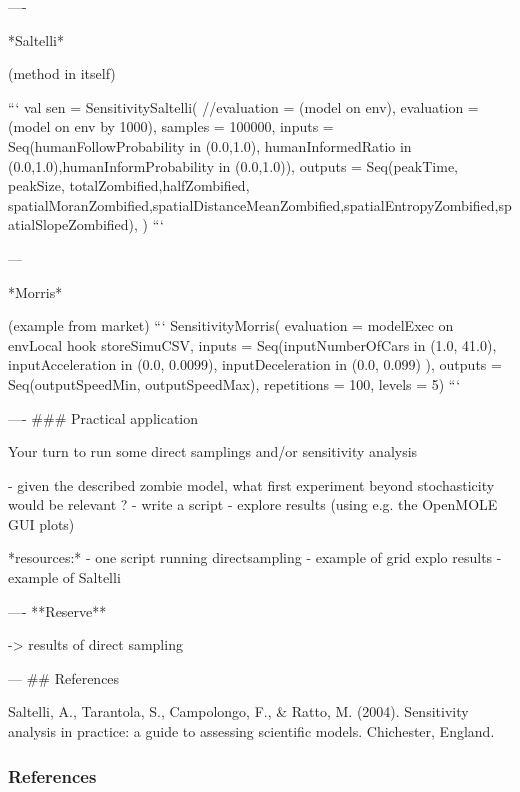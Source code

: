 \documentclass{../beamer_template/myBeamer}
\begin{document}
----

*Saltelli*

(method in itself)

```
val sen = SensitivitySaltelli(
  //evaluation = (model on env),
  evaluation = (model on env by 1000),
  samples = 100000,
  inputs = Seq(humanFollowProbability in (0.0,1.0), humanInformedRatio in (0.0,1.0),humanInformProbability in (0.0,1.0)),
  outputs = Seq(peakTime, peakSize, totalZombified,halfZombified, spatialMoranZombified,spatialDistanceMeanZombified,spatialEntropyZombified,spatialSlopeZombified),
  )
```

---

*Morris*

(example from market)
```
SensitivityMorris(
    evaluation = modelExec on envLocal hook storeSimuCSV,
    inputs = Seq(inputNumberOfCars in (1.0, 41.0), 
                inputAcceleration in (0.0, 0.0099),
                inputDeceleration in (0.0, 0.099)
                ),
    outputs = Seq(outputSpeedMin, outputSpeedMax),
    repetitions = 100,
    levels = 5)
```

----
### Practical application

Your turn to run some direct samplings and/or sensitivity analysis

  - given the described zombie model, what first experiment beyond stochasticity would be relevant ?
  - write a script
  - explore results (using e.g. the OpenMOLE GUI plots)

*resources:*
 - one script running directsampling
 - example of grid explo results
 - example of Saltelli



----
**Reserve**

-> results of direct sampling



---
## References 

Saltelli, A., Tarantola, S., Campolongo, F., & Ratto, M. (2004). Sensitivity analysis in practice: a guide to assessing scientific models. Chichester, England.









\backupbegin

\appendix


\begin{frame}[allowframebreaks]
\frametitle{References}


\end{frame}


\backupend
\end{document}
